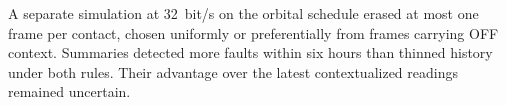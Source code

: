 A separate simulation at 32~bit/s on the orbital schedule erased at most one frame per contact, chosen uniformly or preferentially from frames carrying OFF context. Summaries detected more faults within six hours than thinned history under both rules. Their advantage over the latest contextualized readings remained uncertain.
